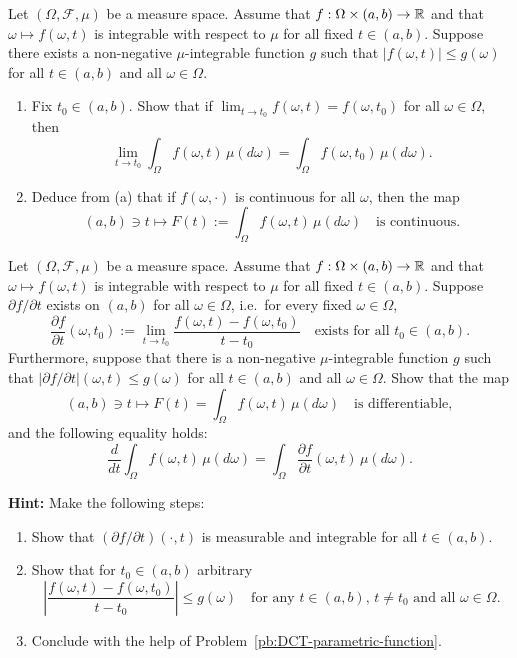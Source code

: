\begin{problem}\label{pb:DCT-parametric-function}
	Let $(\Omega,\mathcal{F},\mu)$ be a measure space. Assume that $f:\Omega\times(a,b)\to\mathbb R$ and that $\omega\mapsto f(\omega,t)$ is integrable with respect to $\mu$ for all fixed $t\in(a,b)$. Suppose there exists a non-negative $\mu$-integrable function $g$ such that $|f(\omega,t)|\le g(\omega)$ for all $t\in(a,b)$ and all $\omega\in\Omega$. 
	\begin{enumerate}[label={(\alph*)}]
		\item Fix $t_0\in(a,b)$. Show that if $\lim_{t\to t_0} f(\omega,t)=f(\omega,t_0)$ for all $\omega\in\Omega$, then
		\[
			\lim_{t\to t_0}\int_\Omega f(\omega,t)\,\mu(d\omega) = \int_\Omega f(\omega,t_0)\,\mu(d\omega).
		\]
		\item Deduce from (a) that if $f(\omega,\cdot)$ is continuous for all $\omega$, then the map
		\[
			(a,b)\ni t\mapsto F(t):=\int_\Omega f(\omega,t)\,\mu(d\omega)\quad\text{is continuous.}
		\]
	\end{enumerate}
\end{problem}

\begin{problem}
		Let $(\Omega,\mathcal{F},\mu)$ be a measure space. Assume that $f:\Omega\times(a,b)\to\mathbb R$ and that $\omega\mapsto f(\omega,t)$ is integrable with respect to $\mu$ for all fixed $t\in(a,b)$. Suppose $\partial f/\partial t$ exists on $(a,b)$ for all $\omega\in \Omega$, i.e.\ for every fixed $\omega\in\Omega$,
		\[
			\frac{\partial f}{\partial t}(\omega, t_0):=\lim_{t\to t_0} \frac{f(\omega,t)-f(\omega,t_0)}{t-t_0} \quad\text{exists for all $t_0\in(a,b)$}.
		\]
		Furthermore, suppose that there is a non-negative $\mu$-integrable function $g$ such that $|\partial f/\partial t|(\omega,t)\le g(\omega)$ for all $t\in(a,b)$ and all $\omega\in\Omega$. Show that the map
		\[
			(a,b)\ni t\mapsto F(t) = \int_\Omega f(\omega,t)\,\mu(d\omega)\quad\text{is differentiable},
		\]
		and the following equality holds:
		\[
			\frac{d}{dt}\int_\Omega f(\omega,t)\,\mu(d\omega) = \int_\Omega \frac{\partial f}{\partial t}(\omega,t)\,\mu(d\omega).
		\]
		
		\smallskip
		
		\noindent\textbf{Hint:} Make the following steps:
		\begin{enumerate}[label={(\arabic*)}]
			\item Show that $(\partial f/\partial t)(\cdot,t)$ is measurable and integrable for all $t\in(a,b)$.
			\item Show that for $t_0\in(a,b)$ arbitrary
			\[
				\left|\frac{f(\omega,t)-f(\omega,t_0)}{t-t_0}\right| \le g(\omega)\quad\text{for any $t\in(a,b)$, $t\ne t_0$ and all $\omega\in\Omega$.}
			\]
			\item Conclude with the help of Problem~\ref{pb:DCT-parametric-function}.
		\end{enumerate}
\end{problem}

